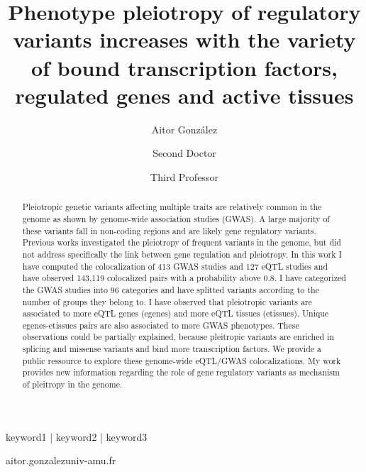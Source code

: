 
\title{Phenotype pleiotropy of regulatory variants increases with the variety of bound transcription factors, regulated genes and active tissues}
	
\author[1,\Letter]{Aitor González }
\author[2]{Second Doctor }
\author[1]{Third Professor }
\date{}

\maketitle

\begin{abstract}

Pleiotropic genetic variants affecting multiple traits are relatively common in the genome as shown by genome-wide association studies (GWAS).
A large majority of these variants fall in non-coding regions and are likely gene regulatory variants.
Previous works investigated the pleiotropy of frequent variants in the genome, but did not address specifically the link between gene regulation and pleiotropy.
%
In this work I have computed the colocalization of 413 GWAS studies and 127 eQTL studies and have observed 143,119 colocalized pairs with a probability above 0.8.
I have categorized the GWAS studies into 96 categories and have splitted variants according to the number of groups they belong to.
I have observed that pleiotropic variants are associated to more eQTL genes (egenes) and more eQTL tissues (etissues).
Unique egenes-etissues pairs are also associated to more GWAS phenotypes.
These observations could be partially explained, because pleitropic variants are enriched in splicing and missense variants and bind more transcription factors.
We provide a public ressource to explore these genome-wide eQTL/GWAS colocalizations.
%
My work provides new information regarding the role of gene regulatory variants as mechanism of pleitropy in the genome.


\lipsum[1][1]
\end{abstract}

\begin{keywords}
keyword1 | keyword2 | keyword3
\end{keywords}

\begin{corrauthor}
aitor.gonzalez\at univ-amu.fr
\end{corrauthor}

